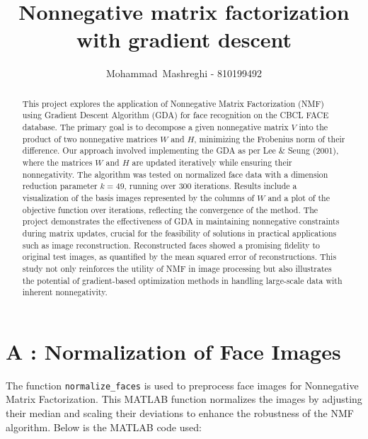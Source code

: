 \documentclass[journal,12pt,onecolumn,draftclsnofoot]{IEEEtran}
\begin{document}
\title{Nonnegative matrix factorization with gradient descent}

\author{Mohammad~Mashreghi - 810199492}

\maketitle

\begin{abstract}
This project explores the application of Nonnegative Matrix Factorization (NMF) using Gradient Descent Algorithm (GDA) for face recognition on the CBCL FACE database. The primary goal is to decompose a given nonnegative matrix \( V \) into the product of two nonnegative matrices \( W \) and \( H \), minimizing the Frobenius norm of their difference. Our approach involved implementing the GDA as per Lee \& Seung (2001), where the matrices \( W \) and \( H \) are updated iteratively while ensuring their nonnegativity. The algorithm was tested on normalized face data with a dimension reduction parameter \( k = 49 \), running over 300 iterations. Results include a visualization of the basis images represented by the columns of \( W \) and a plot of the objective function over iterations, reflecting the convergence of the method. The project demonstrates the effectiveness of GDA in maintaining nonnegative constraints during matrix updates, crucial for the feasibility of solutions in practical applications such as image reconstruction. Reconstructed faces showed a promising fidelity to original test images, as quantified by the mean squared error of reconstructions. This study not only reinforces the utility of NMF in image processing but also illustrates the potential of gradient-based optimization methods in handling large-scale data with inherent nonnegativity.
\end{abstract}

\section*{A : Normalization of Face Images}

The function \texttt{normalize\_faces} is used to preprocess face images for Nonnegative Matrix Factorization. This MATLAB function normalizes the images by adjusting their median and scaling their deviations to enhance the robustness of the NMF algorithm. Below is the MATLAB code used:
\end{document}
